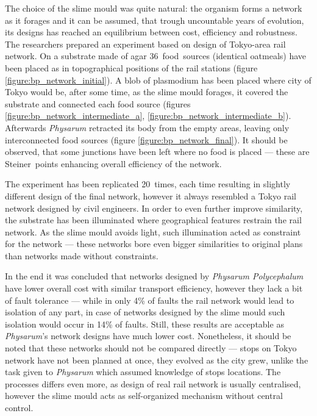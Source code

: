 The choice of the slime mould was quite natural: the organism forms a network as it forages and it can be assumed, that trough uncountable years of evolution, its designs has reached an equilibrium between cost, efficiency and robustness. The researchers prepared an experiment based on design of Tokyo-area rail network. On a substrate made of agar 36~food~sources (identical oatmeals) have been placed as in topographical positions of the rail stations (figure \ref{figure:bp_network_initial}). A blob of plasmodium has been placed where city of Tokyo would be, after some time, as the slime mould forages, it covered the substrate and connected each food source (figures \ref{figure:bp_network_intermediate_a}, \ref{figure:bp_network_intermediate_b}). Afterwards \textit{Physarum} retracted its body from the empty areas, leaving only interconnected food sources (figure \ref{figure:bp_network_final}). It should be observed, that some junctions have been left where no food is placed --- these are Steiner~points \cite{kou1981fast} enhancing overall efficiency of the network.

The experiment has been replicated 20~times, each time resulting in slightly different design of the final network, however it always resembled a Tokyo rail network designed by civil engineers. In order to even further improve similarity, the substrate has been illuminated where geographical features restrain the rail network. As the slime mould avoids light, such illumination acted as constraint for the network --- these networks bore even bigger similarities to original plans than networks made without constraints. 

In the end it was concluded that networks designed by \textit{Physarum Polycephalum} have lower overall cost with similar transport efficiency, however they lack a bit of fault tolerance --- while in only 4\% of faults the rail network would lead to isolation of any part, in case of networks designed by the slime mould such isolation would occur in 14\% of faults. Still, these results are acceptable as \textit{Physarum}'s network designs have much lower cost. Nonetheless, it should be noted that these networks should not be compared directly --- stops on Tokyo network have not been planned at once, they evolved as the city grew, unlike the task given to \textit{Physarum} which assumed knowledge of stops locations. The processes differs even more, as design of real rail network is usually centralised, however the slime mould acts as self-organized mechanism without central control.



